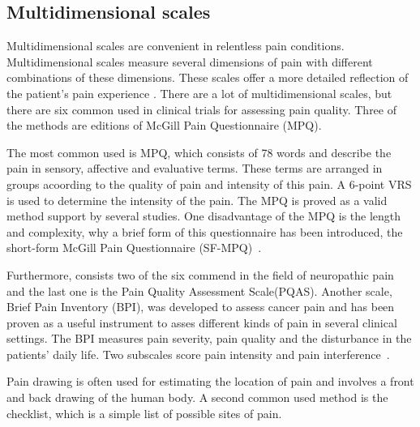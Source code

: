 \subsection{Multidimensional scales}
Multidimensional scales are convenient in relentless pain conditions. Multidimensional scales measure several dimensions of pain with different combinations of these dimensions. These scales offer a more detailed reflection of the patient's pain experience \cite{Briggs2010}. 
There are a lot of multidimensional scales, but there are six common used in clinical trials for assessing pain quality. Three of the methods are editions of McGill Pain Questionnaire (MPQ).

The most common used is MPQ, which consists of 78 words and describe the pain in sensory, affective and evaluative terms. These terms are arranged in groups acoording to the quality of pain and intensity of this pain. A 6-point VRS is used to determine the intensity of the pain. The MPQ is proved as a valid method support by several studies. One disadvantage of the MPQ is the length and complexity, why a brief form of this questionnaire has been introduced, the short-form McGill Pain Questionnaire (SF-MPQ)~\cite{Katz2001}. 

Furthermore, consists two of the six commend in the field of neuropathic pain and the last one is the Pain Quality Assessment Scale(PQAS). Another scale, Brief Pain Inventory (BPI), was developed to assess cancer pain and has been proven as a useful instrument to asses different kinds of pain in several clinical settings. The BPI measures pain severity, pain quality and the disturbance in the patients' daily life. Two subscales score pain intensity and pain interference~\cite{Katz2001}.  

Pain drawing is often used for estimating the location of pain and involves a front and back drawing of the human body. A second common used method is the checklist, which is a simple list of possible sites of pain.~\cite{Jensen2001} 



